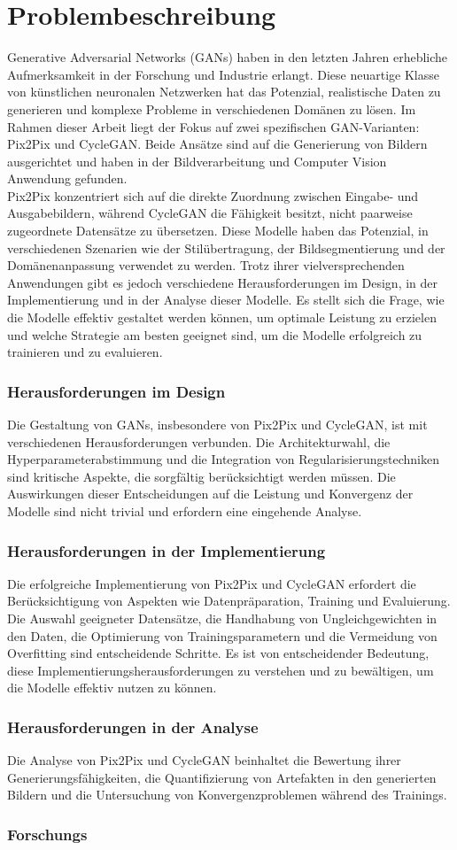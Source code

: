 \chapter{Problembeschreibung}
Generative Adversarial Networks (GANs) haben in den letzten Jahren erhebliche Aufmerksamkeit in der Forschung und Industrie erlangt. Diese neuartige Klasse von künstlichen neuronalen Netzwerken hat das Potenzial, realistische Daten zu generieren und komplexe Probleme in verschiedenen Domänen zu lösen. Im Rahmen dieser Arbeit liegt der Fokus auf zwei spezifischen GAN-Varianten: Pix2Pix und CycleGAN. Beide Ansätze sind auf die Generierung von Bildern ausgerichtet und haben in der Bildverarbeitung und Computer Vision Anwendung gefunden.
\\
Pix2Pix konzentriert sich auf die direkte Zuordnung zwischen Eingabe- und Ausgabebildern, während CycleGAN die Fähigkeit besitzt, nicht paarweise zugeordnete Datensätze zu übersetzen. Diese Modelle haben das Potenzial, in verschiedenen Szenarien wie der Stilübertragung, der Bildsegmentierung und der Domänenanpassung verwendet zu werden. Trotz ihrer vielversprechenden Anwendungen gibt es jedoch verschiedene Herausforderungen im Design, in der Implementierung und in der Analyse dieser Modelle. Es stellt sich die Frage, wie die Modelle effektiv gestaltet werden können, um optimale Leistung zu erzielen und welche Strategie am besten geeignet sind, um die Modelle erfolgreich zu trainieren und zu evaluieren. 
\subsection{Herausforderungen im Design}
Die Gestaltung von GANs, insbesondere von Pix2Pix und CycleGAN, ist mit verschiedenen Herausforderungen verbunden. Die Architekturwahl, die Hyperparameterabstimmung und die Integration von Regularisierungstechniken sind kritische Aspekte, die sorgfältig berücksichtigt werden müssen. Die Auswirkungen dieser Entscheidungen auf die Leistung und Konvergenz der Modelle sind nicht trivial und erfordern eine eingehende Analyse.
\subsection{Herausforderungen in der Implementierung}
Die erfolgreiche Implementierung von Pix2Pix und CycleGAN erfordert die Berücksichtigung von Aspekten wie Datenpräparation, Training und Evaluierung. Die Auswahl geeigneter Datensätze, die Handhabung von Ungleichgewichten in den Daten, die Optimierung von Trainingsparametern und die Vermeidung von Overfitting sind entscheidende Schritte. Es ist von entscheidender Bedeutung, diese Implementierungsherausforderungen zu verstehen und zu bewältigen, um die Modelle effektiv nutzen zu können.
\subsection{Herausforderungen in der Analyse}
Die Analyse von Pix2Pix und CycleGAN beinhaltet die Bewertung ihrer Generierungsfähigkeiten, die Quantifizierung von Artefakten in den generierten Bildern und die Untersuchung von Konvergenzproblemen während des Trainings. 
\subsection{Forschungs}